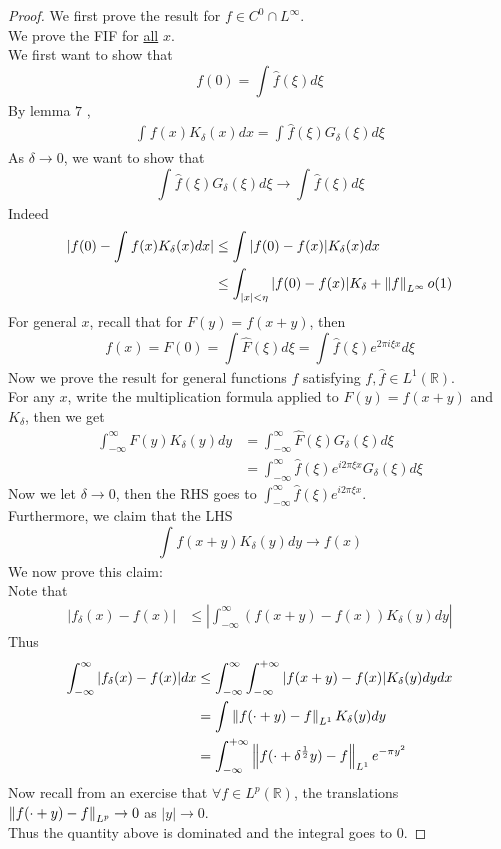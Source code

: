 \documentclass[../main.tex]{subfiles}
\begin{document}
\begin{proof}
We first prove the result for $f \in C^{0}\cap L^{ \infty }$.\\
We prove the FIF for \underline{all} $x$.\\
We first want to show that
\[ 
f( 0) = \int_{  }^{  } \hat{f}( \xi) d\xi
\]
By lemma $7$ ,
\begin{align*}
\int_{  }^{  } f( x) K_\delta ( x) dx = \int_{  }^{  }\hat{f}( \xi) G_\delta( \xi) d\xi
\end{align*}
As $\delta \to 0$, we want to show that
\[ 
\int_{  }^{  } \hat{f}( \xi) G_\delta( \xi) d\xi \to \int_{  }^{  } \hat{f}( \xi) d\xi
\]
Indeed
\begin{align*}
|f( 0) - \int_{  }^{  }f( x) K_\delta( x) dx| & \leq \int_{  }^{  } |f( 0) - f( x) | K_\delta ( x) dx\\
					      & \leq \int_{ |x| < \eta }^{  } | f( 0) - f( x)| K_\delta + \left\lVert f\right\rVert _{L^{ \infty }} o( 1)
\end{align*}
For general $x$, recall that for $F( y) = f( x+y) $, then
\[ 
f( x) = F( 0) = \int_{  }^{  } \hat{F}( \xi) d\xi = \int_{  }^{  } \hat{f}( \xi) e^{2 \pi i \xi x} d\xi
\]
Now we prove the result for general functions $f$ satisfying $f,\hat{f}\in L^{1 }( \mathbb{R}) $.\\
For any $x$, write the multiplication formula applied to  $F( y) = f( x+y) $ and $K_\delta$, then we get
\begin{align*}
\int_{ - \infty  }^{ \infty  } F( y) K_\delta( y) dy &= \int_{ - \infty  }^{ \infty  } \hat{F}( \xi) G_\delta( \xi) d\xi\\
&= \int_{ - \infty  }^{ \infty  } \hat{f}( \xi) e^{i 2 \pi \xi x}  G_\delta( \xi) d\xi
\end{align*}
Now we let $\delta\to 0$, then the RHS goes to $ \int_{ - \infty  }^{ \infty  } \hat{f}( \xi) e^{i 2 \pi \xi x} $.\\
Furthermore, we claim that the LHS 
\[ 
\int_{  }^{  } f( x+y) K_\delta( y) dy \to f( x) 
\]
We now prove this claim:\\
Note that
\begin{align*}
	|f_\delta ( x) - f( x)| & \leq  |\int_{ - \infty  }^{ \infty  } ( f( x+y) - f( x) ) K_\delta( y) dy|
\end{align*}
Thus
\begin{align*}
	\int_{ - \infty  }^{ \infty  } |f_\delta ( x) - f( x) | dx &\leq  \int_{ - \infty  }^{ \infty  } \int_{-\infty}^{+\infty} |f( x+y) - f( x) | K_\delta ( y) dy dx\\
								   & = \int_{  }^{  } \left\lVert f( \cdot + y) - f\right\rVert_{L^{1}}  K_\delta ( y) dy\\
  &=  \int_{-\infty}^{+\infty} \left\lVert f(  \cdot + \delta^{\frac{1}{2}}y) -f\right\rVert _{L^{1}} e^{- \pi y ^{2}} 
\end{align*}
Now recall from an exercise that $\forall f \in L^{p}(  \mathbb{R}) $, the translations $ \left\lVert f( \cdot + y) - f\right\rVert_{L^{p}} \to 0$ as $|y|\to 0$.\\
Thus the quantity above is dominated and the integral goes to 0.

				

\end{proof}
\end{document}
